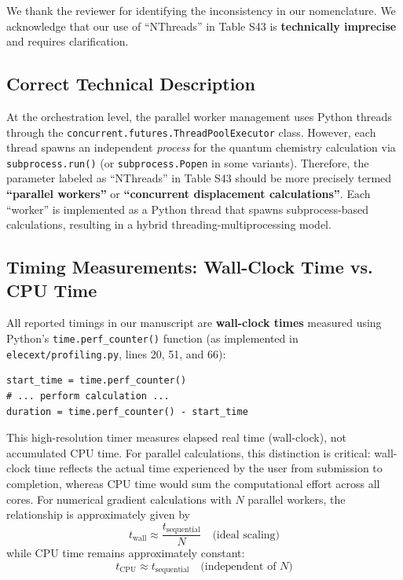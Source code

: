 \documentclass[11pt]{article}
\begin{document}
We thank the reviewer for identifying the inconsistency in our nomenclature. We acknowledge that our use of ``NThreads'' in Table S43 is \textbf{technically imprecise} and requires clarification.

\subsection{Correct Technical Description}

At the orchestration level, the parallel worker management uses Python threads through the \texttt{concurrent.futures.ThreadPoolExecutor} class. However, each thread spawns an independent \textit{process} for the quantum chemistry calculation via \texttt{subprocess.run()} (or \texttt{subprocess.Popen} in some variants). Therefore, the parameter labeled as ``NThreads'' in Table S43 should be more precisely termed \textbf{``parallel workers''} or \textbf{``concurrent displacement calculations''}. Each ``worker'' is implemented as a Python thread that spawns subprocess-based calculations, resulting in a hybrid threading-multiprocessing model.

\subsection{Timing Measurements: Wall-Clock Time vs. CPU Time}

All reported timings in our manuscript are \textbf{wall-clock times} measured using Python's \texttt{time.perf\_counter()} function (as implemented in \texttt{elecext/profiling.py}, lines 20, 51, and 66):

\begin{lstlisting}
start_time = time.perf_counter()
# ... perform calculation ...
duration = time.perf_counter() - start_time
\end{lstlisting}

This high-resolution timer measures elapsed real time (wall-clock), not accumulated CPU time. For parallel calculations, this distinction is critical: wall-clock time reflects the actual time experienced by the user from submission to completion, whereas CPU time would sum the computational effort across all cores. For numerical gradient calculations with $N$ parallel workers, the relationship is approximately given by
\begin{equation}
t_{\text{wall}} \approx \frac{t_{\text{sequential}}}{N} \quad \text{(ideal scaling)}
\end{equation}
while CPU time remains approximately constant:
\begin{equation}
t_{\text{CPU}} \approx t_{\text{sequential}} \quad \text{(independent of $N$)}
\end{equation}
\end{document}
